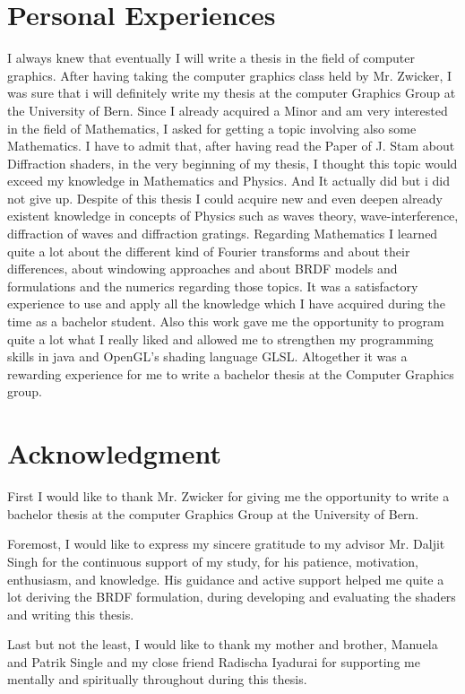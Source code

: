 \section{Personal Experiences}
I always knew that eventually I will write a thesis in the field of computer graphics. After having taking the computer graphics class held by Mr. Zwicker, I was sure that i will definitely write my thesis at the computer Graphics Group at the University of Bern. Since I already acquired a Minor and am very interested in the field of Mathematics, I asked for getting a topic involving also some Mathematics. I have to admit that, after having read the Paper of J. Stam about Diffraction shaders, in the very beginning of my thesis, I thought this topic would exceed my knowledge in Mathematics and Physics. And It actually did but i did not give up. Despite of this thesis I could acquire new and even deepen already existent knowledge in concepts of Physics such as waves theory, wave-interference, diffraction of waves and diffraction gratings. Regarding Mathematics I learned quite a lot about the different kind of Fourier transforms and about their differences, about windowing approaches and about BRDF models and formulations and the numerics regarding those topics. It was a satisfactory experience to use and apply all the knowledge which I have acquired during the time as a bachelor student. Also this work gave me the opportunity to program quite a lot what I really liked and allowed me to strengthen my programming skills in java and OpenGL's shading language GLSL. Altogether it was a rewarding experience for me to write a bachelor thesis at the Computer Graphics group.

\section{Acknowledgment}
First I would like to thank Mr. Zwicker for giving me the opportunity to write a bachelor thesis at the computer Graphics Group at the University of Bern.

Foremost, I would like to express my sincere gratitude to my advisor Mr. Daljit Singh for the continuous support of my study, for his patience, motivation, enthusiasm, and knowledge. His guidance and active support helped me quite a lot deriving the BRDF formulation, during developing and evaluating the shaders and writing this thesis. 
  
Last but not the least, I would like to thank my mother and brother, Manuela and Patrik Single and my close friend Radischa Iyadurai for supporting me mentally and spiritually throughout during this thesis.
